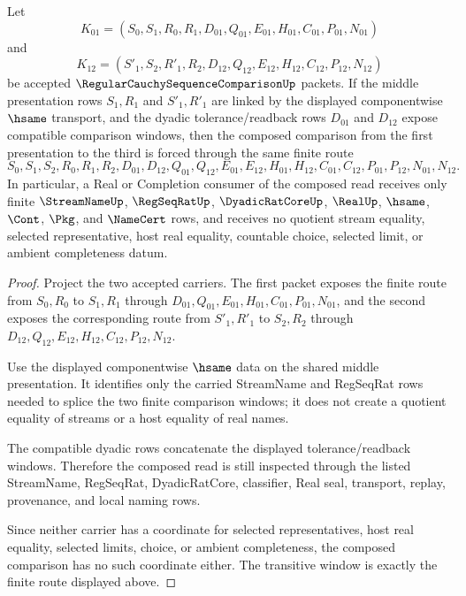 \begin{theorem}\label{thm:regular-cauchy-sequence-comparison-transitive-window}
Let
$$
K_{01}=(S_0,S_1,R_0,R_1,D_{01},Q_{01},E_{01},H_{01},C_{01},P_{01},N_{01})
$$
and
$$
K_{12}=(S'_1,S_2,R'_1,R_2,D_{12},Q_{12},E_{12},H_{12},C_{12},P_{12},N_{12})
$$
be accepted $\RegularCauchySequenceComparisonUp$ packets. If the middle presentation rows $S_1,R_1$ and $S'_1,R'_1$ are linked by the displayed componentwise $\hsame$ transport, and the dyadic tolerance/readback rows $D_{01}$ and $D_{12}$ expose compatible comparison windows, then the composed comparison from the first presentation to the third is forced through the same finite route
$$
S_0,S_1,S_2,R_0,R_1,R_2,D_{01},D_{12},Q_{01},Q_{12},E_{01},E_{12},H_{01},H_{12},C_{01},C_{12},P_{01},P_{12},N_{01},N_{12}.
$$
In particular, a Real or Completion consumer of the composed read receives only finite $\StreamNameUp$, $\RegSeqRatUp$, $\DyadicRatCoreUp$, $\RealUp$, $\hsame$, $\Cont$, $\Pkg$, and $\NameCert$ rows, and receives no quotient stream equality, selected representative, host real equality, countable choice, selected limit, or ambient completeness datum.
\end{theorem}
\begin{proof}
Project the two accepted carriers. The first packet exposes the finite route from $S_0,R_0$ to $S_1,R_1$ through $D_{01},Q_{01},E_{01},H_{01},C_{01},P_{01},N_{01}$, and the second exposes the corresponding route from $S'_1,R'_1$ to $S_2,R_2$ through $D_{12},Q_{12},E_{12},H_{12},C_{12},P_{12},N_{12}$.

Use the displayed componentwise $\hsame$ data on the shared middle presentation. It identifies only the carried StreamName and RegSeqRat rows needed to splice the two finite comparison windows; it does not create a quotient equality of streams or a host equality of real names.

The compatible dyadic rows concatenate the displayed tolerance/readback windows. Therefore the composed read is still inspected through the listed StreamName, RegSeqRat, DyadicRatCore, classifier, Real seal, transport, replay, provenance, and local naming rows.

Since neither carrier has a coordinate for selected representatives, host real equality, selected limits, choice, or ambient completeness, the composed comparison has no such coordinate either. The transitive window is exactly the finite route displayed above.
\end{proof}

